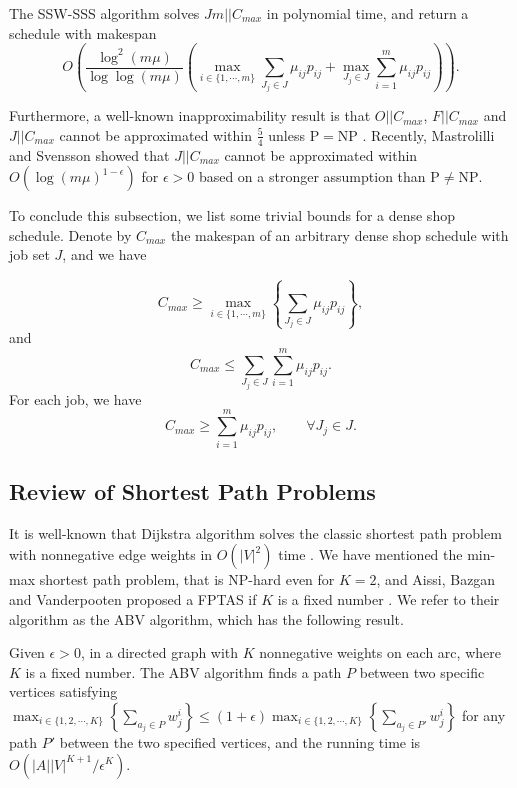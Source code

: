 \documentclass{llncs}
\newcommand{\be}{\begin{equation}}
\newcommand{\ee}{\end{equation}}
\numberwithin{subcase}{case}
\begin{document}
\begin{theorem}
The SSW-SSS algorithm solves $Jm||C_{max}$ in polynomial time, and return a schedule with makespan
$$O\left(\frac{\log^2(m\mu)}{\log{\log(m\mu)}} \left(\max_{i\in\{1,\cdots,m\}}{\sum_{J_j\in J}\mu_{ij}p_{ij}}+ \max_{J_j\in J}{\sum^{m}_{i=1}\mu_{ij}p_{ij}}\right)\right).$$\label{th_SSW_SSS}
\end{theorem}

Furthermore, a well-known inapproximability result is that $O||C_{max}$, $F||C_{max}$ and $J||C_{max}$ cannot be approximated within $\frac{5}{4}$ unless $\mathrm{P}=\mathrm{NP}$ \cite{Williamson97}. Recently, Mastrolilli and Svensson \cite{Mastrolilli:2011:HAF:2027216.2027218} showed that $J||C_{max}$ cannot be approximated within $O(\log(m\mu)^{1-\epsilon})$ for $\epsilon > 0$ based on a stronger assumption than $\mathrm{P}\neq\mathrm{NP}$.

To conclude this subsection, we list some trivial bounds for a dense shop schedule. Denote by $C_{max}$ the makespan of an arbitrary dense shop schedule with job set $J$, and we have

\be
C_{max} \geq \max_{i\in\{1,\cdots,m\}}\left\{\sum_{J_j\in J}\mu_{ij}p_{ij}\right\},\label{eq_max}
\ee
and
\be
C_{max} \leq \sum_{J_j\in J}\sum^m_{i=1}\mu_{ij}p_{ij}.\label{eq_min}
\ee
For each job, we have
\be
C_{max} \geq \sum^m_{i=1}\mu_{ij}p_{ij},\qquad \forall J_j \in J.\label{eq_job}
\ee

\subsection{Review of Shortest Path Problems}\label{sec_sp}
It is well-known that Dijkstra algorithm solves the classic shortest path problem with nonnegative edge weights in $O(|V|^2)$ time \cite{DIJ59}.
We have mentioned the min-max shortest path problem, that is $\mathrm{NP}$-hard even for $K = 2$, and Aissi, Bazgan and Vanderpooten proposed a FPTAS if $K$ is a fixed number \cite{ABV06}. We refer to their algorithm as the ABV algorithm, which has the following result.

\begin{theorem}\label{th_minmax}
Given $\epsilon > 0$, in a directed graph with $K$ nonnegative weights on each arc, where $K$ is a fixed number. The ABV algorithm finds a path $P$ between two specific vertices satisfying $\max_{i\in \{1, 2, \cdots, K\}} \left\{\sum_{a_j\in P}w^i_j\right\} \leq (1+\epsilon) \max_{i\in \{1, 2, \cdots, K\}}\left\{\sum_{a_j\in P'}w^i_j\right\}$
for any path $P'$ between the two specified vertices, and the running time is $O(|A||V|^{K + 1}/\epsilon^K)$.
\end{theorem}
\end{document}
